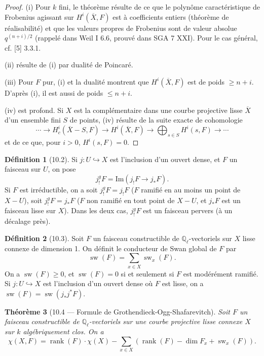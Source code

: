 \documentclass[11pt]{amsart}
\theoremstyle{plain}
\newtheorem{theorem}{Th\'eor\`eme}[section]
\theoremstyle{definition}
\newtheorem{definition}[theorem]{D\'efinition}
\DeclareMathOperator{\rank}{rank}
\DeclareMathOperator{\sw}{sw}
\begin{document}
\begin{proof}
(i) Pour $k$ fini, le th\'eor\`eme r\'esulte de ce que le polyn\^ome caract\'eristique de Frobenius agissant sur $H^i(\overline{X}, F)$ est \`a coefficients entiers (th\'eor\`eme de r\'ealisabilit\'e) et que les valeurs propres de Frobenius sont de valeur absolue $q^{(n+i)/2}$ (rappel\'e dans Weil I 6.6, prouv\'e dans SGA 7 XXI). Pour le cas g\'en\'eral, cf. [5] 3.3.1.

(ii) r\'esulte de (i) par dualit\'e de Poincar\'e.

(iii) Pour $F$ pur, (i) et la dualit\'e montrent que $H^i(\overline{X}, F)$ est de poids $\geq n+i$. D'apr\`es (i), il est aussi de poids $\leq n+i$.

(iv) est profond. Si $X$ est la compl\'ementaire dans une courbe projective lisse $\overline{X}$ d'un ensemble fini $S$ de points, (iv) r\'esulte de la suite exacte de cohomologie
\[
\cdots \to H^i_c(\overline{X} - S, F) \to H^i(\overline{X}, F) \to \bigoplus_{s \in S} H^i(s, F) \to \cdots
\]
et de ce que, pour $i > 0$, $H^i(s, F) = 0$.
\end{proof}

\begin{definition}[10.2]
Si $j: U \hookrightarrow X$ est l'inclusion d'un ouvert dense, et $F$ un faisceau sur $U$, on pose
\[
j_!^g F = \mathrm{Im}(j_! F \to j_* F).
\]
Si $F$ est irr\'eductible, on a soit $j_!^g F = j_! F$ ($F$ ramifi\'e en au moins un point de $X - U$), soit $j_!^g F = j_* F$ ($F$ non ramifi\'e en tout point de $X - U$, et $j_* F$ est un faisceau lisse sur $X$). Dans les deux cas, $j_!^g F$ est un faisceau pervers (\`a un d\'ecalage pr\`es).
\end{definition}

\begin{definition}[10.3]
Soit $F$ un faisceau constructible de $\mathbb{Q}_\ell$-vectoriels sur $X$ lisse connexe de dimension 1. On d\'efinit le conducteur de Swan global de $F$ par
\[
\sw(F) = \sum_{x \in X} \sw_x(F).
\]
On a $\sw(F) \geq 0$, et $\sw(F) = 0$ si et seulement si $F$ est mod\'er\'ement ramifi\'e. Si $j: U \hookrightarrow X$ est l'inclusion d'un ouvert dense o\`u $F$ est lisse, on a $\sw(F) = \sw(j_* j^* F)$.
\end{definition}

\begin{theorem}[10.4 --- Formule de Grothendieck-Ogg-Shafarevitch]
Soit $F$ un faisceau constructible de $\mathbb{Q}_\ell$-vectoriels sur une courbe projective lisse connexe $X$ sur $k$ alg\'ebriquement clos. On a
\[
\chi(X, F) = \rank(F) \cdot \chi(X) - \sum_{x \in X} (\rank(F) - \dim F_x + \sw_x(F)).
\]
\end{theorem}
\end{document}
